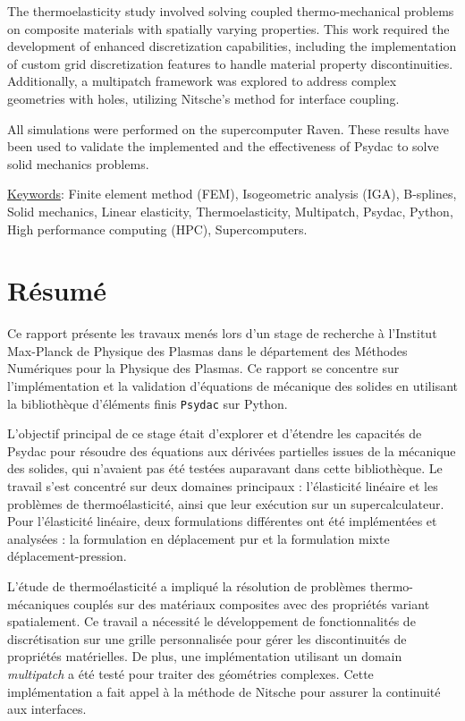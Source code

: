 \documentclass[a4paper,12pt,twoside]{report}
\begin{document}
The thermoelasticity study involved solving coupled thermo-mechanical problems on composite materials with spatially varying properties. This work required the development of enhanced discretization capabilities, including the implementation of custom grid discretization features to handle material property discontinuities. Additionally, a multipatch framework was explored to address complex geometries with holes, utilizing Nitsche's method for interface coupling.

All simulations were performed on the supercomputer Raven. These results have been used to validate the implemented and the effectiveness of Psydac to solve solid mechanics problems.

\vspace{0.4cm}

\underline{Keywords}: Finite element method (FEM), Isogeometric analysis (IGA), B-splines, Solid mechanics, Linear elasticity, Thermoelasticity, Multipatch, Psydac, Python, High performance computing (HPC), Supercomputers.

\section*{Résumé}

Ce rapport présente les travaux menés lors d'un stage de recherche à l'Institut Max-Planck de Physique des Plasmas dans le département des Méthodes Numériques pour la Physique des Plasmas. Ce rapport se concentre sur l'implémentation et la validation d'équations de mécanique des solides en utilisant la bibliothèque d'éléments finis \texttt{Psydac} sur Python.

L'objectif principal de ce stage était d'explorer et d'étendre les capacités de Psydac pour résoudre des équations aux dérivées partielles issues de la mécanique des solides, qui n'avaient pas été testées auparavant dans cette bibliothèque. Le travail s'est concentré sur deux domaines principaux : l'élasticité linéaire et les problèmes de thermoélasticité, ainsi que leur exécution sur un supercalculateur. Pour l'élasticité linéaire, deux formulations différentes ont été implémentées et analysées : la formulation en déplacement pur et la formulation mixte déplacement-pression.

L'étude de thermoélasticité a impliqué la résolution de problèmes thermo-mécaniques couplés sur des matériaux composites avec des propriétés variant spatialement. Ce travail a nécessité le développement de fonctionnalités de discrétisation sur une grille personnalisée pour gérer les discontinuités de propriétés matérielles. De plus, une implémentation utilisant un domain \textit{multipatch} a été testé pour traiter des géométries complexes. Cette implémentation a fait appel à la méthode de Nitsche pour assurer la continuité aux interfaces.
\end{document}

